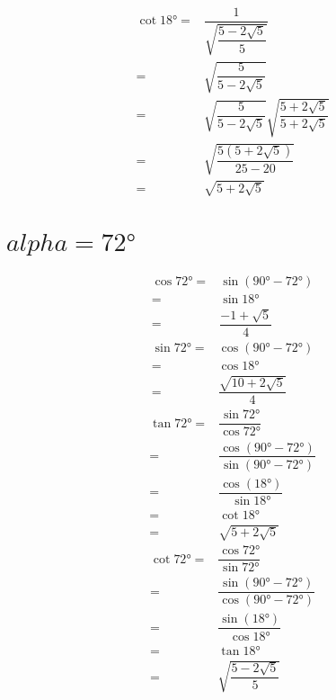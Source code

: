  	 \begin{align*}
 	 	\cot\ang{18}=&\dfrac{1}{\sqrt{\dfrac{5-2\sqrt{5}}{5}}}\\
 	 	=&\sqrt{\dfrac{5}{5-2\sqrt{5}}}\\
 	 	=&\sqrt{\dfrac{5}{5-2\sqrt{5}}}\sqrt{\dfrac{5+2\sqrt{5}}{5+2\sqrt{5}}}\\
 	 	=&\sqrt{\dfrac{5(5+2\sqrt{5})}{25-20}}\\
 	 	=&\sqrt{5+2\sqrt{5}}
\end{align*}
\section{$alpha=\ang{72}$}
\begin{align*}
	\cos\ang{72}=&\sin(\ang{90}-\ang{72})\\
	=&\sin\ang{18}\\
	=&\dfrac{-1+\sqrt{5}}{4}
\end{align*}
\begin{align*}
	\sin\ang{72}=&\cos(\ang{90}-\ang{72})\\
	=&\cos\ang{18}\\
	=&\dfrac{\sqrt{10+2\sqrt{5}}}{4}
\end{align*}
\begin{align*}
	\tan\ang{72}=&\dfrac{\sin\ang{72}}{\cos\ang{72}}\\
	=&\dfrac{\cos(\ang{90}-\ang{72})}{\sin(\ang{90}-\ang{72})}\\
	=&\dfrac{\cos(\ang{18})}{\sin\ang{18}}\\	
	=&\cot\ang{18}\\
	=&\sqrt{5+2\sqrt{5}}
\end{align*}
\begin{align*}
	\cot\ang{72}=&\dfrac{\cos\ang{72}}{\sin\ang{72}}\\
	=&\dfrac{\sin(\ang{90}-\ang{72})}{\cos(\ang{90}-\ang{72})}\\
	=&\dfrac{\sin(\ang{18})}{\cos\ang{18}}\\	
	=&\tan\ang{18}\\
	=&\sqrt{\dfrac{5-2\sqrt{5}}{5}}
\end{align*}